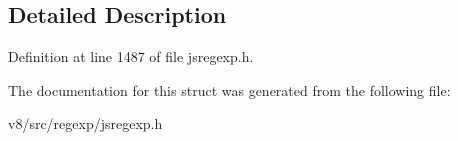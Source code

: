 \subsection{Detailed Description}


Definition at line 1487 of file jsregexp.\+h.



The documentation for this struct was generated from the following file\+:\begin{DoxyCompactItemize}
\item 
v8/src/regexp/jsregexp.\+h\end{DoxyCompactItemize}
